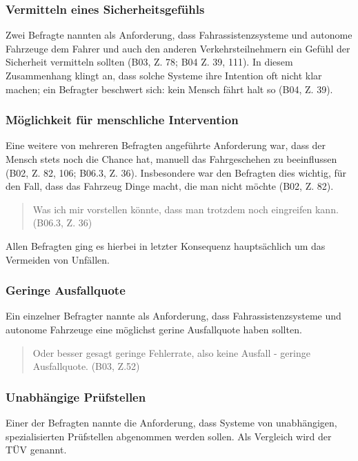 \documentclass[12pt]{article}
\begin{document}
\subsubsection*{Vermitteln eines Sicherheitsgefühls}
Zwei Befragte nannten als Anforderung, dass Fahrassistenzsysteme und autonome Fahrzeuge dem Fahrer und auch den anderen Verkehrsteilnehmern ein Gefühl der Sicherheit vermitteln sollten (B03, Z. 78; B04 Z. 39, 111). In diesem Zusammenhang klingt an, dass solche Systeme ihre Intention oft nicht klar machen; ein Befragter beschwert sich: \glqq kein Mensch fährt halt so\grqq{} (B04, Z. 39).

\subsubsection*{Möglichkeit für menschliche Intervention}
Eine weitere von mehreren Befragten angeführte Anforderung war, dass der Mensch stets noch die Chance hat, manuell das Fahrgeschehen zu beeinflussen (B02, Z. 82, 106; B06.3, Z. 36). Insbesondere war den Befragten dies wichtig, für den Fall, dass \glqq das Fahrzeug Dinge macht, die man nicht möchte\grqq{} (B02, Z. 82).

\begin{quote}
  Was ich mir vorstellen könnte, dass man trotzdem noch eingreifen kann. (B06.3, Z. 36)
\end{quote}

Allen Befragten ging es hierbei in letzter Konsequenz hauptsächlich um das Vermeiden von Unfällen.

\subsubsection*{Geringe Ausfallquote}
Ein einzelner Befragter nannte als Anforderung, dass Fahrassistenzsysteme und autonome Fahrzeuge eine möglichst gerine Ausfallquote haben sollten.

\begin{quote}
  Oder besser gesagt geringe Fehlerrate, also keine Ausfall - geringe Ausfallquote. (B03, Z.52)
\end{quote}

\subsubsection*{Unabhängige Prüfstellen}
Einer der Befragten nannte die Anforderung, dass Systeme von unabhängigen, spezialisierten Prüfstellen abgenommen werden sollen. Als Vergleich wird der TÜV genannt.
\end{document}
